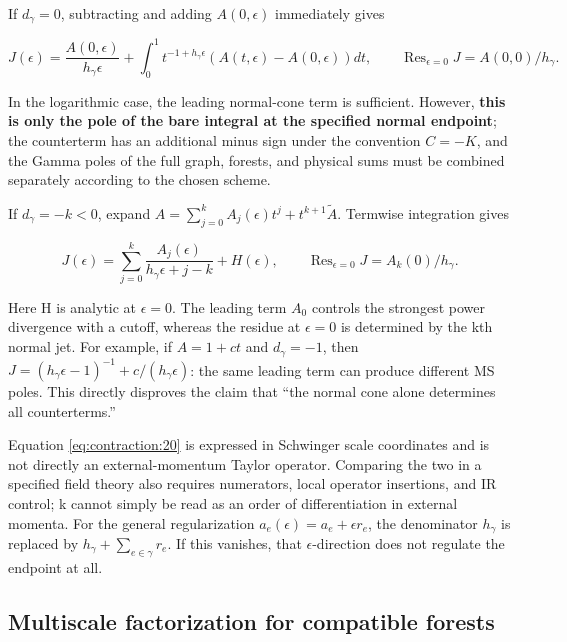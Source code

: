 \documentclass[11pt,a4paper,oneside]{article}
\theoremstyle{plain}
\theoremstyle{definition}
\theoremstyle{remark}
\numberwithin{equation}{section}
\begin{document}
If \(d_\gamma =0\), subtracting and adding \(A(0,\epsilon )\) immediately gives

\begin{equation}
J(\epsilon)=\frac{A(0,\epsilon)}{h_\gamma\epsilon}
      +\int_0^1 t^{-1+h_\gamma\epsilon}(A(t,\epsilon)-A(0,\epsilon))dt,
 \qquad\operatorname{Res}_{\epsilon=0}J=A(0,0)/h_\gamma.          \label{eq:contraction:19}
\end{equation}

In the logarithmic case, the leading normal-cone term is sufficient. However, \textbf{this is only the pole of the bare integral at the specified normal endpoint}; the counterterm has an additional minus sign under the convention \(C=- K\), and the Gamma poles of the full graph, forests, and physical sums must be combined separately according to the chosen scheme.

If \(d_\gamma =- k<0\), expand \(A=\sum _{j=0}^k A_j(\epsilon )t^j+t^{k+1}\widetilde A\). Termwise integration gives

\begin{equation}
J(\epsilon)=\sum_{j=0}^k\frac{A_j(\epsilon)}{h_\gamma\epsilon+j-k}
                  +H(\epsilon),\qquad
 \operatorname{Res}_{\epsilon=0}J=A_k(0)/h_\gamma.                \label{eq:contraction:20}
\end{equation}

Here H is analytic at \(\epsilon =0\). The leading term \(A_0\) controls the strongest power divergence with a cutoff, whereas the residue at \(\epsilon =0\) is determined by the kth normal jet. For example, if \(A=1+c t\) and \(d_\gamma =- 1\), then \(J=(h_\gamma \epsilon - 1)^{-1}+c/(h_\gamma \epsilon )\): the same leading term can produce different MS poles. This directly disproves the claim that ``the normal cone alone determines all counterterms.''

Equation \eqref{eq:contraction:20} is expressed in Schwinger scale coordinates and is not directly an external-momentum Taylor operator. Comparing the two in a specified field theory also requires numerators, local operator insertions, and IR control; k cannot simply be read as an order of differentiation in external momenta. For the general regularization \(a_e(\epsilon )=a_e+\epsilon r_e\), the denominator \(h_\gamma \) is replaced by \(h_\gamma +\sum _{e\in \gamma }r_e\). If this vanishes, that \(\epsilon \)-direction does not regulate the endpoint at all.


\subsection{Multiscale factorization for compatible forests}\label{sec:contraction:6}
\end{document}
